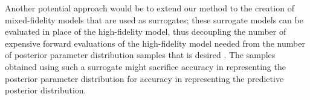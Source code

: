 Another potential approach would be to extend our method to the creation of mixed-fidelity models that are used as surrogates; these surrogate models can be evaluated in place of the high-fidelity model, thus decoupling the number of expensive forward evaluations of the high-fidelity model needed from the number of posterior parameter distribution samples that is desired \cite{Con14}. The samples obtained using such a surrogate might sacrifice accuracy in representing the posterior parameter distribution for accuracy in representing the predictive posterior distribution. 




